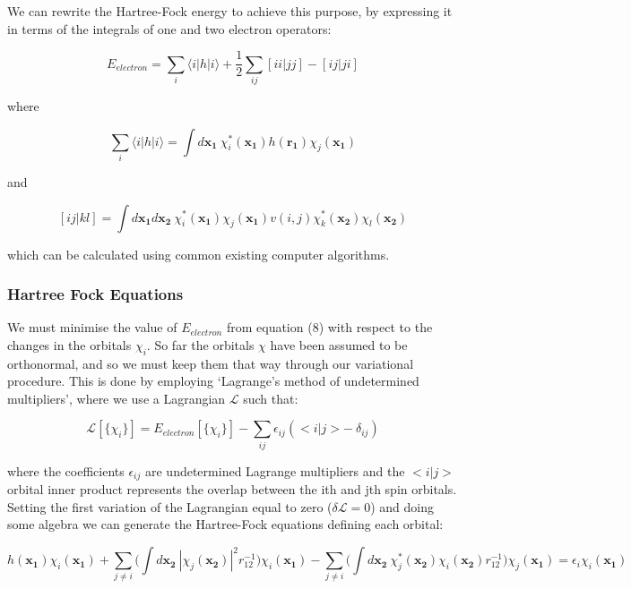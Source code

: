 \documentclass[10pt]{article}
\begin{document}
We can rewrite the Hartree-Fock energy to achieve this purpose, by expressing it in terms of the integrals of one and two electron operators:

\begin{equation}
	E_{electron} = \sum_{i}\langle i|h|i\rangle + \frac{1}{2}\sum_{ij}[ii|jj]-[ij|ji]
\end{equation}

where

$$\sum_{i}\langle i|h|i\rangle = \int d\mathbf{x_1} \ \chi^*_i(\mathbf{x_1})h(\mathbf{r_1})\chi_j(\mathbf{x_1})$$

and

$$[ij|kl] = \int d\mathbf{x_1} d\mathbf{x_2} \ \chi^*_i(\mathbf{x_1})\chi_j(\mathbf{x_1})v(i,j)\chi^*_k(\mathbf{x_2})\chi_l(\mathbf{x_2})$$

which can be calculated using common existing computer algorithms.

\subsubsection{Hartree Fock Equations}
We must minimise the value of $E_{electron}$ from equation (8) with respect to the changes in the orbitals $\chi_i$. So far the orbitals $\chi$ have been assumed to be orthonormal, and so we must keep them that way through our variational procedure. This is done by employing `Lagrange's method of undetermined multipliers', where we use a Lagrangian $\mathcal{L}$ such
that:

\begin{equation*}
	\mathcal{L}[\{\chi_i\}] = E_{electron}[\{\chi_i\}]-\sum_{ij}\epsilon_{ij}(<i|j>- \ \delta_{ij})
\end{equation*}

where the coefficients $\epsilon_{ij}$ are undetermined Lagrange multipliers and the $<i|j>$ orbital inner product represents the overlap between the ith and jth spin orbitals. Setting the first variation of the Lagrangian equal to zero ($\delta\mathcal{L} = 0$) and doing some algebra we can generate the Hartree-Fock equations defining each orbital:

\begin{equation}
	h(\mathbf{x_1})\chi_i(\mathbf{x_1})+\sum_{j \not= i}\biggr(\int d\mathbf{x_2} \ |\chi_j(\mathbf{x_2})|^2r_{12}^{-1}\biggr)\chi_i(\mathbf{x_1})-\sum_{j \not= i}\biggr(\int d\mathbf{x_2} \ \chi_j^*(\mathbf{x_2})\chi_i(\mathbf{x_2})r_{12}^{-1}\biggr)\chi_j(\mathbf{x_1}) = \epsilon_i\chi_i(\mathbf{x_1})
\end{equation}
\end{document}
